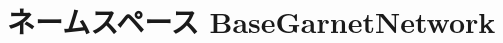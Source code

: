 \hypertarget{namespaceBaseGarnetNetwork}{
\section{ネームスペース BaseGarnetNetwork}
\label{namespaceBaseGarnetNetwork}
}
